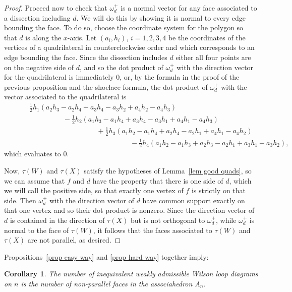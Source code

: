 \documentclass[11pt]{article}
\newtheorem{cor}[thm]{Corollary}
\theoremstyle{remark}
\theoremstyle{definition}
\begin{document}
\begin{proof}
    Proceed now to check that $\omega^+_d$ is a normal vector for any face associated to a dissection including $d$.  We will do this by showing it is normal to every edge bounding the face.  To do so, choose the coordinate system for the polygon so that $d$ is along the $x$-axis.  Let $(a_i, h_i)$, $i=1,2,3,4$ be the coordinates of the vertices of a quadrilateral in counterclockwise order and which corresponds to an edge bounding the face.  Since the dissection includes $d$ either all four points are on the negative side of $d$, and so the dot product of $\omega^+_d$ with the direction vector for the quadrilateral is immediately $0$, or, by the formula in the proof of the previous proposition and the shoelace formula, the dot product of $\omega^+_d$ with the vector associated to the quadrilateral is
    \begin{align*}
       & \hspace{1cm}\textstyle\frac{1}{2}h_1(a_2h_3-a_2h_4+a_3h_4-a_3h_2+a_4h_2-a_4h_3) \\
       &\hspace{3cm} - \textstyle\frac{1}{2} h_2(a_1h_3-a_1h_4+a_3h_4-a_3h_1+a_4h_1-a_4h_3) \\
       &\hspace{5cm}+ \textstyle\frac{1}{2}h_3(a_1h_2-a_1h_4+a_2h_4-a_2h_1+a_4h_1-a_4h_2) \\
       &\hspace{7cm}- \textstyle\frac{1}{2}h_4(a_1h_2-a_1h_3+a_2h_3-a_2h_1+a_3h_1-a_3h_2), 
    \end{align*}
    which evaluates to 0.

    Now, $\tau(W)$ and $\tau(X)$ satisfy the hypotheses of Lemma~\ref{lem good quads}, so we can assume that $f$ and $d$ have the property that there is one side of $d$, which we will call the positive side, so that exactly one vertex of $f$ is strictly on that side.  Then $\omega^+_d$ with the direction vector of $d$ have common support exactly on that one vertex and so their dot product is nonzero.  Since the direction vector of $d$ is contained in the direction of $\tau(X)$ but is not orthogonal to $\omega^+_d$, while $\omega^+_d$ is normal to the face of $\tau(W)$, it follows that the faces associated to $\tau(W)$ and $\tau(X)$ are not parallel, as desired.
\end{proof}


Propositions~\ref{prop easy way} and \ref{prop hard way} together imply:
\begin{cor}\label{cor:count inequiv diagrams}
  The number of inequivalent weakly admissible Wilson loop diagrams on $n$ is the number of non-parallel faces in the associahedron $A_n$.
\end{cor}
\end{document}
